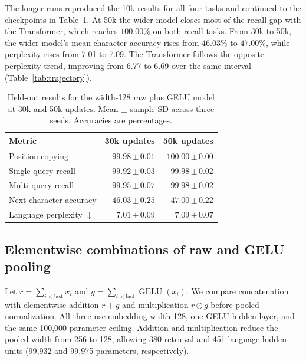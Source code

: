 \documentclass[11pt]{article}
\newcommand{\sd}[2]{#1\,{\scriptstyle\pm\,#2}}
\begin{document}
The longer runs reproduced the 10k results for all four tasks and continued to the checkpoints in Table~\ref{tab:wide-pooling-long}. At 50k the wider model closes most of the recall gap with the Transformer, which reaches \(100.00\%\) on both recall tasks. From 30k to 50k, the wider model's mean character accuracy rises from \(46.03\%\) to \(47.00\%\), while perplexity rises from 7.01 to 7.09. The Transformer follows the opposite perplexity trend, improving from 6.77 to 6.69 over the same interval (Table~\ref{tab:trajectory}).

\begin{table}[htbp]
\centering\small
\caption{Held-out results for the width-128 raw plus GELU model at 30k and 50k updates. Mean \(\pm\) sample SD across three seeds. Accuracies are percentages.}
\label{tab:wide-pooling-long}
\begin{tabular}{lrr}
\toprule
Metric & 30k updates & 50k updates\\
\midrule
Position copying & \(\sd{99.98}{0.01}\) & \(\sd{100.00}{0.00}\)\\
Single-query recall & \(\sd{99.92}{0.03}\) & \(\sd{99.98}{0.02}\)\\
Multi-query recall & \(\sd{99.95}{0.07}\) & \(\sd{99.98}{0.02}\)\\
Next-character accuracy & \(\sd{46.03}{0.25}\) & \(\sd{47.00}{0.22}\)\\
Language perplexity \(\downarrow\) & \(\sd{7.01}{0.09}\) & \(\sd{7.09}{0.07}\)\\
\bottomrule
\end{tabular}
\end{table}

\subsection{Elementwise combinations of raw and GELU pooling}
Let \(r=\sum_{i<\mathrm{last}}x_i\) and \(g=\sum_{i<\mathrm{last}}\operatorname{GELU}(x_i)\). We compare concatenation with elementwise addition \(r+g\) and multiplication \(r\odot g\) before pooled normalization. All three use embedding width 128, one GELU hidden layer, and the same 100,000-parameter ceiling. Addition and multiplication reduce the pooled width from 256 to 128, allowing 380 retrieval and 451 language hidden units (99,932 and 99,975 parameters, respectively).
\end{document}
